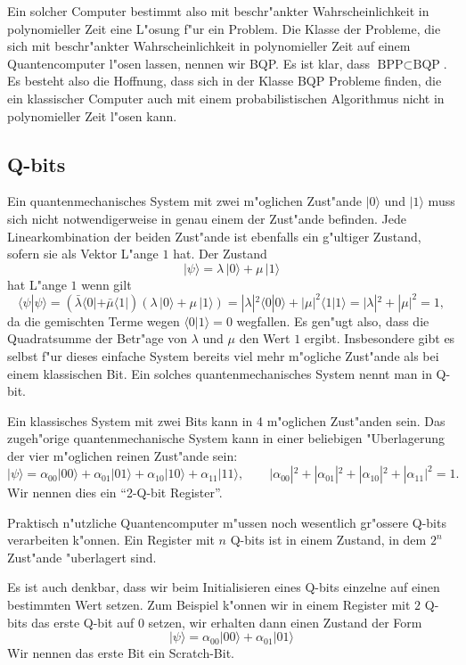 Ein solcher Computer bestimmt also mit beschr"ankter Wahrscheinlichkeit
in polynomieller Zeit eine L"osung f"ur ein Problem. Die
Klasse der Probleme, die sich mit beschr"ankter Wahrscheinlichkeit in
polynomieller Zeit auf einem Quantencomputer l"osen lassen, nennen wir
BQP.
Es ist klar, dass $\text{BPP}\subset\text{BQP}$.
Es besteht also die Hoffnung, dass sich in der Klasse BQP Probleme finden,
die ein klassischer Computer auch mit einem probabilistischen Algorithmus
nicht in polynomieller Zeit l"osen kann.

\subsection{Q-bits}
Ein quantenmechanisches System mit zwei m"oglichen Zust"ande $|0\rangle$
und $|1\rangle$ muss sich nicht
notwendigerweise in genau einem der Zust"ande befinden.
Jede Linearkombination der beiden Zust"ande ist ebenfalls ein g"ultiger
Zustand, sofern sie als Vektor L"ange $1$ hat.
Der Zustand
\[
|\psi\rangle
=
\lambda \,|0\rangle + \mu\,|1\rangle
\]
hat L"ange $1$ wenn gilt
\[
\langle\psi|\psi\rangle
=
(
\bar\lambda
\langle 0|
+
\bar\mu
\langle 1|
)
(
\lambda \,|0\rangle + \mu\,|1\rangle
)
=
|\lambda|^2\langle 0|0\rangle + |\mu|^2\langle 1|1\rangle
=
|\lambda|^2+|\mu|^2
=
1
,
\]
da die gemischten Terme wegen $\langle 0|1\rangle=0$ wegfallen.
Es gen"ugt also, dass die Quadratsumme der Betr"age von $\lambda$ und $\mu$
den Wert $1$ ergibt.
Insbesondere gibt es selbst f"ur dieses einfache System bereits viel
mehr m"ogliche Zust"ande als bei einem klassischen Bit.
Ein solches quantenmechanisches System nennt man in Q-bit.

Ein klassisches System mit zwei Bits kann in 4 m"oglichen Zust"anden sein.
Das zugeh"orige quantenmechanische System kann in einer beliebigen
"Uberlagerung der vier m"oglichen reinen Zust"ande sein:
\[
|\psi\rangle
=
\alpha_{00}|00\rangle
+
\alpha_{01}|01\rangle
+
\alpha_{10}|10\rangle
+
\alpha_{11}|11\rangle
,\qquad
|\alpha_{00}|^2
+
|\alpha_{01}|^2
+
|\alpha_{10}|^2
+
|\alpha_{11}|^2
=1.
\]
Wir nennen dies ein ``2-Q-bit Register''.

Praktisch n"utzliche Quantencomputer m"ussen noch wesentlich gr"ossere
Q-bits verarbeiten k"onnen.
Ein Register mit $n$ Q-bits ist in einem Zustand, in dem $2^n$ Zust"ande
"uberlagert sind.

Es ist auch denkbar, dass wir beim Initialisieren eines Q-bits
einzelne auf einen bestimmten Wert setzen.
Zum Beispiel k"onnen wir in einem Register mit $2$ Q-bits das erste
Q-bit auf $0$ setzen, wir erhalten dann einen Zustand der
Form
\[
|\psi\rangle
=
\alpha_{00}|00\rangle
+
\alpha_{01}|01\rangle
\]
Wir nennen das erste Bit ein Scratch-Bit.

